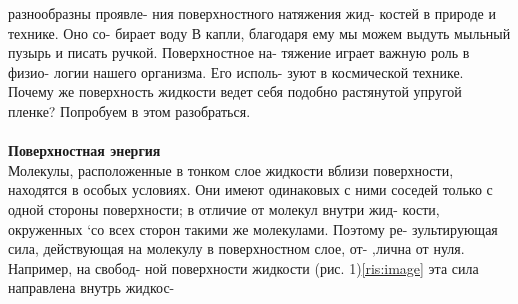 \setlength{\columnsep}{30pt}
\begin{multicols}{2}
\large
{} разнообразны проявле-\linebreak
ния поверхностного натяжения жид-\linebreak
костей в природе и технике. Оно со-\linebreak
бирает воду В капли, благодаря ему\linebreak
мы можем выдуть мыльный пузырь\linebreak
и писать ручкой. Поверхностное на-\linebreak
тяжение играет важную роль в физио-\linebreak
логии нашего организма. Его исполь-\linebreak
зуют в космической технике. Почему\linebreak
же поверхность жидкости ведет себя\linebreak
подобно растянутой упругой пленке?\linebreak
Попробуем в этом разобраться. \\ \\
\large
\textbf{Поверхностная энергия}\\
\large
Молекулы, расположенные в тонком\linebreak
слое жидкости вблизи поверхности,\linebreak
находятся в особых условиях. Они\linebreak
имеют одинаковых с ними соседей\linebreak
только с одной стороны поверхности;\linebreak
в отличие от молекул внутри жид-\linebreak
кости, окруженных ‘со всех сторон\linebreak
такими же молекулами. Поэтому ре-\linebreak
зультирующая сила, действующая на\linebreak
молекулу в поверхностном слое, от-\linebreak
‚лична от нуля. Например, на свобод-\linebreak
ной поверхности жидкости (рис. 1)\ref{ris:image}\linebreak
эта сила направлена внутрь жидкос-



\end{multicols}
